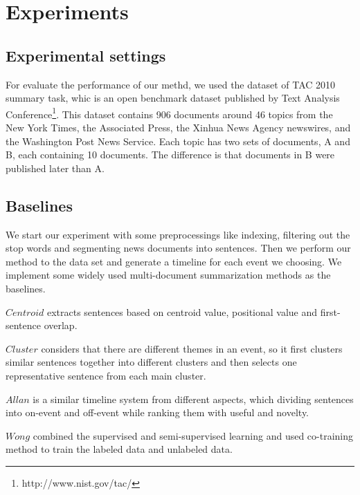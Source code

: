 \documentclass{acm_proc_article-sp}
\begin{document}

%
\section{Experiments}
%

\subsection{Experimental settings}

For evaluate the performance of our methd, we used the dataset of TAC 2010 summary task, whic is an open benchmark dataset published by Text Analysis Conference\footnote{http://www.nist.gov/tac/}.
This dataset contains 906 documents around 46 topics from the New York Times, the Associated Press, the Xinhua News Agency newswires, and the Washington Post News Service.
Each topic has two sets of documents, A and B, each containing 10 documents.
The difference is that documents in B were published later than A.

\subsection{Baselines}

We start our experiment with some preprocessings like indexing, filtering out the stop words and segmenting news documents into sentences. Then we perform our method to the data set and generate a timeline for each event we choosing. We implement some widely used multi-document summarization methods as the baselines.

$Centroid$ extracts sentences based on centroid value, positional value and first-sentence overlap.

$Cluster$ considers that there are different themes in an event, so it first clusters similar sentences together into different clusters and then selects one representative sentence from each main cluster.

$Allan$ is a similar timeline system from different aspects, which dividing sentences into on-event and off-event while ranking them with useful and novelty.

$Wong$ combined the supervised and semi-supervised learning and used co-training method to train the labeled data and unlabeled data. 
\end{document}
